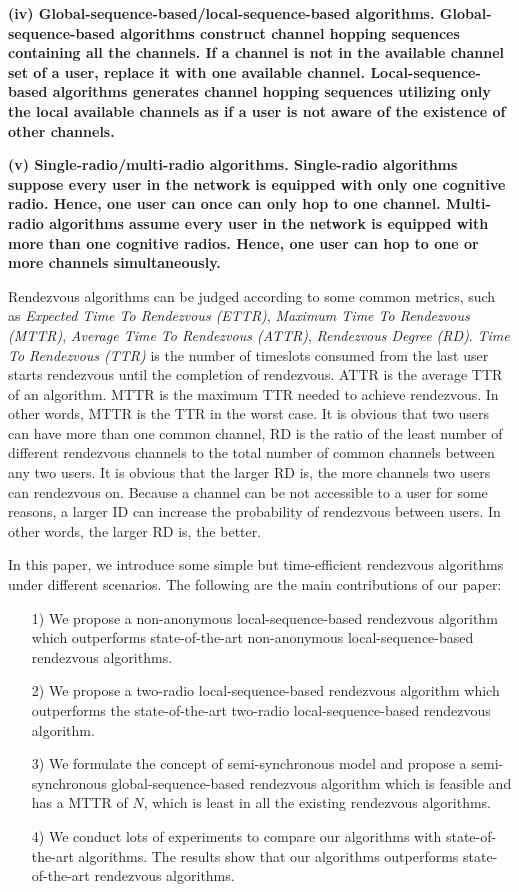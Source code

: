 \documentclass[10pt, conference, letterpaper]{IEEEtran}
\begin{document}
\bfseries (iv) Global-sequence-based/local-sequence-based algorithms. \mdseries Global-sequence-based algorithms construct channel hopping sequences containing all the channels. If a channel is not in the available channel set of a user, replace it with one available channel.
Local-sequence-based algorithms generates channel hopping sequences utilizing only the local available channels as if a user is not aware of the existence of other channels.

\bfseries (v) Single-radio/multi-radio algorithms. \mdseries Single-radio algorithms suppose every user in the network is equipped with only one cognitive radio. Hence, one user can once can only hop to one channel. Multi-radio algorithms assume every user in the network is equipped with more than one cognitive radios. Hence, one user can hop to one or more channels simultaneously.

Rendezvous algorithms can be judged according to some common metrics, such as \emph{Expected Time To Rendezvous (ETTR)}, \emph{Maximum Time To Rendezvous (MTTR)}, \emph{Average Time To Rendezvous (ATTR)}, \emph{Rendezvous Degree (RD)}. \emph{Time To Rendezvous (TTR)} is the number of timeslots consumed from the last user starts rendezvous until the completion of rendezvous. ATTR is the average TTR of an algorithm. MTTR is the maximum TTR needed to achieve rendezvous. In other words, MTTR is the TTR in the worst case. It is obvious that two users can have more than one common channel, RD is the ratio of the least number of different rendezvous channels to the total number of common channels between any two users. It is obvious that the larger RD is, the more channels two users can rendezvous on. Because a channel can be not accessible to a user for some reasons, a larger ID can increase the probability of rendezvous between users. In other words, the larger RD is, the better.

In this paper, we introduce some simple but time-efficient rendezvous algorithms under different scenarios. The following are the main contributions of our paper:
\begin{itemize}
\item[1)] We propose a non-anonymous local-sequence-based rendezvous algorithm which outperforms state-of-the-art non-anonymous local-sequence-based rendezvous algorithms.
\item[2)] We propose a two-radio local-sequence-based rendezvous algorithm which outperforms the state-of-the-art two-radio local-sequence-based rendezvous algorithm.
\item[3)] We formulate the concept of semi-synchronous model and propose a semi-synchronous global-sequence-based rendezvous algorithm which is feasible and has a MTTR of $N$, which is least in all the existing rendezvous algorithms.
\item[4)] We conduct lots of experiments to compare our algorithms with state-of-the-art algorithms. The results show that our algorithms outperforms state-of-the-art rendezvous algorithms.
\end{itemize}
\end{document}

